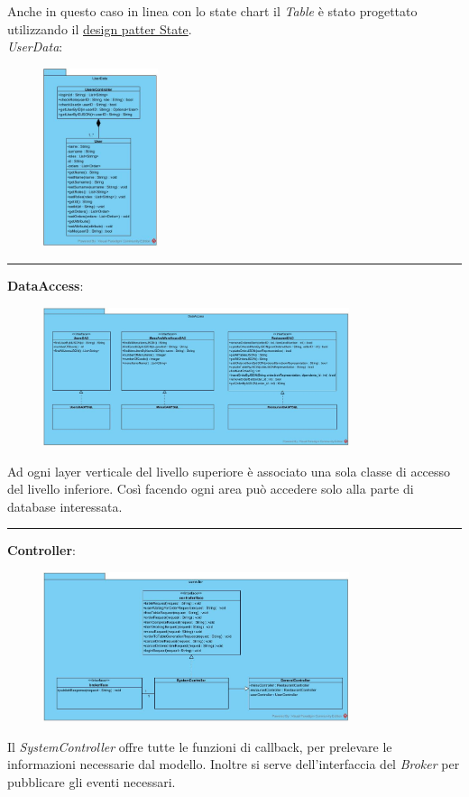 Anche in questo caso in linea con lo state chart il \textit{Table} è stato progettato utilizzando il \underline{design patter State}.
\vspace{0.5cm}
\\\textit{UserData}:
\begin{figure}[H]
	\centering
	\includegraphics[width=0.3\textwidth]{Immagini/UserData.jpg}
\end{figure}
\vspace{0.5cm}
\hrule
\vspace{0.5cm}
\textbf{DataAccess}:
\begin{figure}[H]
	\centering
	\includegraphics[width=0.8\textwidth]{Immagini/DataAccess.jpg}
\end{figure}
Ad ogni layer verticale del livello superiore è associato una sola classe di accesso del livello inferiore. Così facendo ogni area può accedere solo alla parte di database interessata. 
\vspace{0.5cm}
\hrule
\vspace{0.5cm}
\textbf{Controller}:
\begin{figure}[H]
	\centering
	\includegraphics[width=0.8\textwidth]{Immagini/controller.jpg}
\end{figure}
Il \textit{SystemController} offre tutte le funzioni di callback, per prelevare le informazioni necessarie dal modello. Inoltre si serve dell'interfaccia del \textit{Broker} per pubblicare gli eventi necessari.

